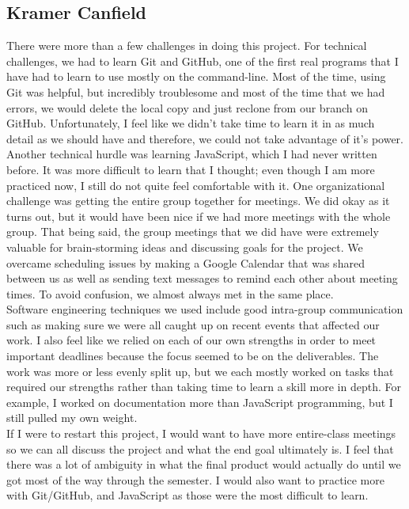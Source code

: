 \documentclass[12pt]{article}
\begin{document}
\subsection{Kramer Canfield}
\begin{changemargin}{1cm}{0cm} 
There were more than a few challenges in doing this project. For technical challenges, we had to learn Git and GitHub, one of the first real programs that I have had to learn to use mostly on the command-line. Most of the time, using Git was helpful, but incredibly troublesome and most of the time that we had errors, we would delete the local copy and just reclone from our branch on GitHub. Unfortunately, I feel like we didn't take time to learn it in as much detail as we should have and therefore, we could not take advantage of it's power. Another technical hurdle was learning JavaScript, which I had never written before. It was more difficult to learn that I thought; even though I am more practiced now, I still do not quite feel comfortable with it. One organizational challenge was getting the entire group together for meetings. We did okay as it turns out, but it would have been nice if we had more meetings with the whole group. That being said, the group meetings that we did have were extremely valuable for brain-storming ideas and discussing goals for the project. We overcame scheduling issues by making a Google Calendar that was shared between us as well as sending text messages to remind each other about meeting times. To avoid confusion, we almost always met in the same place.\\
Software engineering techniques we used include good intra-group communication such as making sure we were all caught up on recent events that affected our work. I also feel like we relied on each of our own strengths in order to meet important deadlines because the focus seemed to be on the deliverables. The work was more or less evenly split up, but we each mostly worked on tasks that required our strengths rather than taking time to learn a skill more in depth. For example, I worked on documentation more than JavaScript programming, but I still pulled my own weight.\\
If I were to restart this project, I would want to have more entire-class meetings so we can all discuss the project and what the end goal ultimately is. I feel that there was a lot of ambiguity in what the final product would actually do until we got most of the way through the semester. I would also want to practice more with Git/GitHub, and JavaScript as those were the most difficult to learn.

\end{changemargin} 
\end{document}
